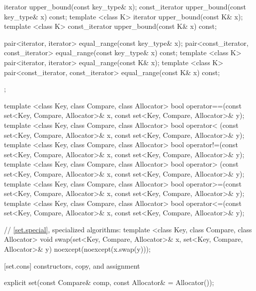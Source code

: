 \begin{codeblock}
{{    iterator       upper_bound(const key_type& x);
    const_iterator upper_bound(const key_type& x) const;
    template <class K> iterator       upper_bound(const K& x);
    template <class K> const_iterator upper_bound(const K& x) const;

    pair<iterator, iterator>               equal_range(const key_type& x);
    pair<const_iterator, const_iterator>   equal_range(const key_type& x) const;
    template <class K>
      pair<iterator, iterator>             equal_range(const K& x);
    template <class K>
      pair<const_iterator, const_iterator> equal_range(const K& x) const;
  };

  template <class Key, class Compare, class Allocator>
    bool operator==(const set<Key, Compare, Allocator>& x,
                    const set<Key, Compare, Allocator>& y);
  template <class Key, class Compare, class Allocator>
    bool operator< (const set<Key, Compare, Allocator>& x,
                    const set<Key, Compare, Allocator>& y);
  template <class Key, class Compare, class Allocator>
    bool operator!=(const set<Key, Compare, Allocator>& x,
                    const set<Key, Compare, Allocator>& y);
  template <class Key, class Compare, class Allocator>
    bool operator> (const set<Key, Compare, Allocator>& x,
                    const set<Key, Compare, Allocator>& y);
  template <class Key, class Compare, class Allocator>
    bool operator>=(const set<Key, Compare, Allocator>& x,
                    const set<Key, Compare, Allocator>& y);
  template <class Key, class Compare, class Allocator>
    bool operator<=(const set<Key, Compare, Allocator>& x,
                    const set<Key, Compare, Allocator>& y);

  // \ref{set.special}, specialized algorithms:
  template <class Key, class Compare, class Allocator>
    void swap(set<Key, Compare, Allocator>& x,
              set<Key, Compare, Allocator>& y)
      noexcept(noexcept(x.swap(y)));
}
\end{codeblock}%
%

[set.cons]{ constructors, copy, and assignment}

%
%
\begin{itemdecl}
explicit set(const Compare& comp, const Allocator& = Allocator());
\end{itemdecl}

